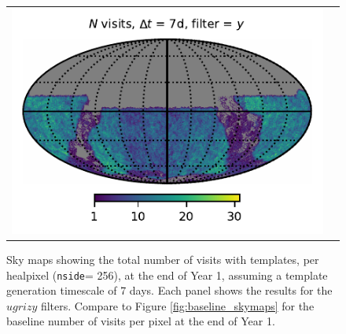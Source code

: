 \documentclass[preprintm,linenumbers]{aastex631}
\newcommand{\nside}{\texttt{nside}\xspace}
\begin{document}
\begin{figure}
\begin{tabular}{@{}c@{}c@{}}
				\includegraphics{results/skymaps/skymap_first_year_one_snap_v4_0_10yrs_db_noDD_noTwi_tscale-7_nside-256_doAllTemplateMetrics_reduceCount_y_noDD_noTwi.pdf} \\
			\end{tabular}
			\caption{Sky maps showing the total number of visits with templates, per healpixel (\nside = 256), at the end of Year 1, assuming a template generation timescale of 7 days. Each panel shows the results for the $ugrizy$ filters.
				Compare to Figure \ref{fig:baseline_skymaps} for the baseline number of visits per pixel at the end of Year 1.
			}
			\label{fig:template_skymaps_tscale-7}
		\end{figure}
\end{document}
